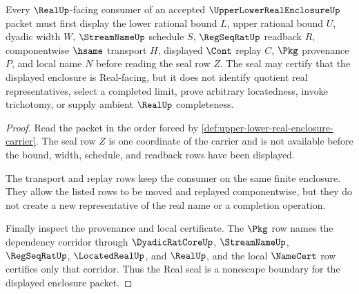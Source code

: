 \begin{theorem}
\label{thm:upper-lower-real-enclosure-real-seal}
Every $\RealUp$-facing consumer of an accepted $\UpperLowerRealEnclosureUp$ packet must first display the lower rational bound $L$, upper rational bound $U$, dyadic width $W$, $\StreamNameUp$ schedule $S$, $\RegSeqRatUp$ readback $R$, componentwise $\hsame$ transport $H$, displayed $\Cont$ replay $C$, $\Pkg$ provenance $P$, and local name $N$ before reading the seal row $Z$. The seal may certify that the displayed enclosure is Real-facing, but it does not identify quotient real representatives, select a completed limit, prove arbitrary locatedness, invoke trichotomy, or supply ambient $\RealUp$ completeness.
\end{theorem}
\begin{proof}
Read the packet in the order forced by \autoref{def:upper-lower-real-enclosure-carrier}. The seal row $Z$ is one coordinate of the carrier and is not available before the bound, width, schedule, and readback rows have been displayed.

The transport and replay rows keep the consumer on the same finite enclosure. They allow the listed rows to be moved and replayed componentwise, but they do not create a new representative of the real name or a completion operation.

Finally inspect the provenance and local certificate. The $\Pkg$ row names the dependency corridor through $\DyadicRatCoreUp$, $\StreamNameUp$, $\RegSeqRatUp$, $\LocatedRealUp$, and $\RealUp$, and the local $\NameCert$ row certifies only that corridor. Thus the Real seal is a nonescape boundary for the displayed enclosure packet.
\end{proof}


\begin{closurestatus}{\UpperLowerRealEnclosureUp}
  \theoryclosure{\seedClosure}
  \formalstatus{\unformalizedV}
\end{closurestatus}
